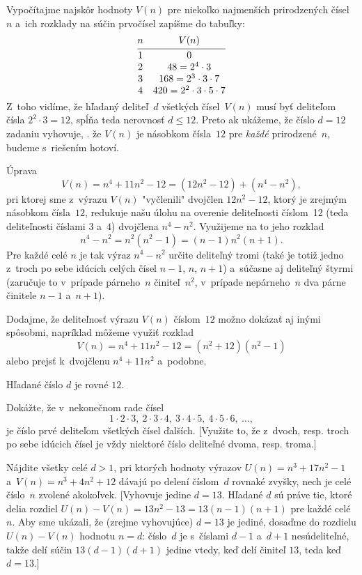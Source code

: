 {%
Vypočítajme najskôr hodnoty $V(n)$ pre niekoľko najmenších
prirodzených čísel~$n$ a~ich rozklady na súčin prvočísel zapíšme do
tabuľky:
$$
\vbox{\let\\=\cr \halign{&\hss$#$\hss&\quad#\cr
n&&V(n)\\ \noalign{\vskip3pt\hrule\vskip3pt}
1&&0\\
2&&48=2^4\cdot3\\
3&&168=2^3\cdot3\cdot7\\
4&&420=2^2\cdot3\cdot5\cdot7\\
}}
$$
Z~toho vidíme, že hľadaný deliteľ~$d$ všetkých čísel~$V(n)$
musí byť deliteľom čísla $2^2\cdot3=12$, spĺňa teda
nerovnosť $d\le12$. Preto ak ukážeme, že
číslo $d=12$ zadaniu vyhovuje, \tj. že $V(n)$ je násobkom čísla~$12$
pre {\it každé\/} prirodzené~$n$, budeme s~riešením hotoví.

Úprava
$$
V(n)=n^4+11n^2-12=(12n^2-12)+(n^4-n^2),
$$
pri ktorej sme z~výrazu $V(n)$ "vyčlenili" dvojčlen $12n^2-12$,
ktorý je zrejmým násobkom čísla~$12$, redukuje
našu úlohu na overenie deliteľnosti číslom~12 (teda deliteľnosti
číslami $3$ a~$4$) dvojčlena $n^4-n^2$. Využijeme na to jeho rozklad
$$
n^4-n^2=n^2(n^2-1)=(n-1)n^2(n+1).
$$
Pre každé celé $n$ je tak výraz $n^4-n^2$ určite deliteľný tromi
(také je totiž jedno z~troch po sebe idúcich celých čísel
$n-1$, $n$, $n+1$) a~súčasne aj deliteľný štyrmi (zaručuje
to v~prípade párneho~$n$ činiteľ~$n^2$, v~prípade nepárneho~$n$ dva
párne činitele $n-1$ a~$n+1$).

Dodajme, že deliteľnosť výrazu $V(n)$ číslom~$12$ možno dokázať
aj inými spôsobmi, napríklad môžeme využiť rozklad
$$
V(n)=n^4+11n^2-12=(n^2+12)(n^2-1)
$$
alebo prejsť k~dvojčlenu $n^4+11n^2$ a~podobne.

\odpoved
Hľadané číslo $d$ je rovné $12$.

Dokážte, že v~nekonečnom rade čísel
$$
1\cdot2\cdot3,\ 2\cdot3\cdot4,\ 3\cdot4\cdot5,\ 4\cdot5\cdot6,\ \dots,
$$
je číslo prvé deliteľom všetkých čísel ďalších.
[Využite to, že z~dvoch, resp. troch po sebe idúcich čísel je
vždy niektoré číslo deliteľné dvoma, resp. troma.]

Nájdite všetky celé $d>1$, pri ktorých hodnoty výrazov
$U(n)=n^3+17n^2-1$ a~$V(n)=n^3+4n^2+12$ dávajú po delení číslom~$d$ rovnaké zvyšky, nech je celé číslo~$n$ zvolené akokoľvek.
[Vyhovuje jedine $d=13$. Hľadané $d$ sú práve tie, ktoré delia rozdiel
${U(n)-V(n)}=13n^2-13=13(n-1)(n+1)$ pre každé celé~$n$. Aby sme
ukázali, že (zrejme vyhovujúce) $d=13$ je jediné, dosaďme do
rozdielu $U(n)-V(n)$ hodnotu $n=d$: číslo~$d$ je s~číslami $d-1$ a~$d+1$
nesúdeliteľné, takže delí súčin $13(d-1)(d+1)$ jedine vtedy, keď delí
činiteľ $13$, teda keď $d=13$.]

}
